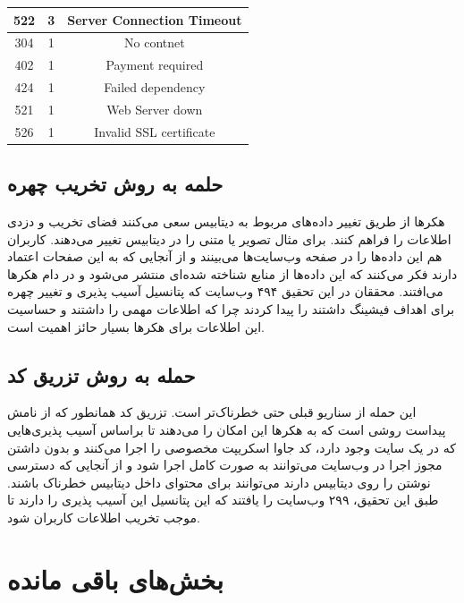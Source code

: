 \documentclass[10pt, a4paper]{article}
\begin{document}
\begin{LTR}
\begin{table}[h]
{\begin{tabular}{|c|c|c|}
                522 & 3 & Server Connection Timeout \\ \hline
                304 & 1 & No contnet \\ \hline
                402 & 1 & Payment required \\ \hline
                424 & 1 & Failed dependency \\ \hline
                521 & 1 & Web Server down \\ \hline
                526 & 1 & Invalid SSL certificate \\ \hline
            \end{tabular}
        }
    \end{table}
\end{LTR}

\subsection{حلمه به روش تخریب چهره}

هکر‌ها از طریق تغییر داده‌های مربوط به دیتابیس سعی می‌کنند فضای تخریب و دزدی
اطلاعات را فراهم کنند. برای مثال تصویر یا متنی را در دیتابیس تغییر می‌دهند.
کاربران هم این داده‌ها را در صفحه وب‌سایت‌ها می‌بینند و از آنجایی که به این
صفحات اعتماد دارند فکر می‌کنند که این داده‌ها از منابع شناخته شده‌ای منتشر
می‌شود و در دام هکر‌ها می‌افتند. محققان در این تحقیق ۴۹۴ وب‌سایت که پتانسیل آسیب
پذیری و تغییر چهره برای اهداف فیشینگ داشتند را پیدا کردند چرا که اطلاعات مهمی را
داشتند و حساسیت این اطلاعات برای هکر‌ها بسیار حائز اهمیت است.

\subsection{حمله به روش تزریق کد}

این حمله از سناریو قبلی حتی خطرناک‌تر است. تزریق کد همانطور که از نامش پیداست
روشی است که به هکر‌ها این امکان را می‌دهند تا براساس آسیب پذیری‌هایی که در یک
سایت وجود دارد، کد جاوا اسکریپت مخصوصی را اجرا می‌کنند و بدون داشتن مجوز اجرا در
وب‌سایت می‌توانند به صورت کامل اجرا شود و از آنجایی که دسترسی نوشتن را روی
دیتابیس دارند می‌توانند برای محتوای داخل دیتابیس خطرناک باشند. طبق این تحقیق،
۲۹۹ وب‌سایت را یافتند که این پتانسیل این آسیب پذیری را دارند تا موجب تخریب
اطلاعات کاربران شود.


\section{بخش‌های باقی مانده}
\end{document}
